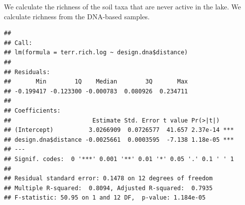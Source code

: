 \documentclass[]{article}
\newenvironment{Shaded}{\begin{snugshade}}{\end{snugshade}}
\newcommand{\CommentTok}[1]{\textcolor[rgb]{0.56,0.35,0.01}{\textit{#1}}}
\newcommand{\DecValTok}[1]{\textcolor[rgb]{0.00,0.00,0.81}{#1}}
\newcommand{\KeywordTok}[1]{\textcolor[rgb]{0.13,0.29,0.53}{\textbf{#1}}}
\newcommand{\NormalTok}[1]{#1}
\newcommand{\OperatorTok}[1]{\textcolor[rgb]{0.81,0.36,0.00}{\textbf{#1}}}
\newcommand{\StringTok}[1]{\textcolor[rgb]{0.31,0.60,0.02}{#1}}
\begin{document}
We calculate the richness of the soil taxa that are never active in the
lake. We calculate richness from the DNA-based samples.

\begin{Shaded}
\end{Shaded}

\begin{verbatim}
## 
## Call:
## lm(formula = terr.rich.log ~ design.dna$distance)
## 
## Residuals:
##       Min        1Q    Median        3Q       Max 
## -0.199417 -0.123300 -0.000783  0.080926  0.234711 
## 
## Coefficients:
##                       Estimate Std. Error t value Pr(>|t|)    
## (Intercept)          3.0266909  0.0726577  41.657 2.37e-14 ***
## design.dna$distance -0.0025661  0.0003595  -7.138 1.18e-05 ***
## ---
## Signif. codes:  0 '***' 0.001 '**' 0.01 '*' 0.05 '.' 0.1 ' ' 1
## 
## Residual standard error: 0.1478 on 12 degrees of freedom
## Multiple R-squared:  0.8094, Adjusted R-squared:  0.7935 
## F-statistic: 50.95 on 1 and 12 DF,  p-value: 1.184e-05
\end{verbatim}

\begin{Shaded}
\end{Shaded}
\end{document}
